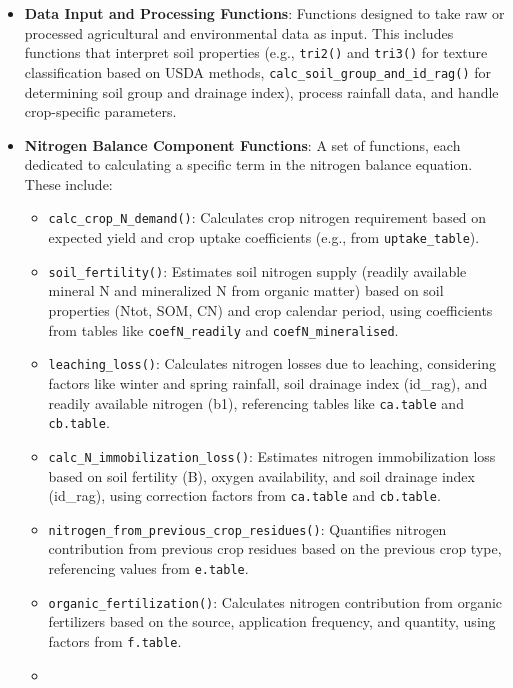 \documentclass[
  11pt,
]{article}
\begin{document}
\begin{itemize}
\item
  \textbf{Data Input and Processing Functions}: Functions designed to
  take raw or processed agricultural and environmental data as input.
  This includes functions that interpret soil properties (e.g.,
  \texttt{tri2()} and \texttt{tri3()} for texture classification based
  on USDA methods, \texttt{calc\_soil\_group\_and\_id\_rag()} for
  determining soil group and drainage index), process rainfall data, and
  handle crop-specific parameters.
\item
  \textbf{Nitrogen Balance Component Functions}: A set of functions,
  each dedicated to calculating a specific term in the nitrogen balance
  equation. These include:

  \begin{itemize}
  \item
    \texttt{calc\_crop\_N\_demand()}: Calculates crop nitrogen
    requirement based on expected yield and crop uptake coefficients
    (e.g., from \texttt{uptake\_table}).
  \item
    \texttt{soil\_fertility()}: Estimates soil nitrogen supply (readily
    available mineral N and mineralized N from organic matter) based on
    soil properties (Ntot, SOM, CN) and crop calendar period, using
    coefficients from tables like \texttt{coefN\_readily} and
    \texttt{coefN\_mineralised}.
  \item
    \texttt{leaching\_loss()}: Calculates nitrogen losses due to
    leaching, considering factors like winter and spring rainfall, soil
    drainage index (id\_rag), and readily available nitrogen (b1),
    referencing tables like \texttt{ca.table} and \texttt{cb.table}.
  \item
    \texttt{calc\_N\_immobilization\_loss()}: Estimates nitrogen
    immobilization loss based on soil fertility (B), oxygen
    availability, and soil drainage index (id\_rag), using correction
    factors from \texttt{ca.table} and \texttt{cb.table}.
  \item
    \texttt{nitrogen\_from\_previous\_crop\_residues()}: Quantifies
    nitrogen contribution from previous crop residues based on the
    previous crop type, referencing values from \texttt{e.table}.
  \item
    \texttt{organic\_fertilization()}: Calculates nitrogen contribution
    from organic fertilizers based on the source, application frequency,
    and quantity, using factors from \texttt{f.table}.
  \item

\end{itemize}
\end{itemize}
\end{document}
